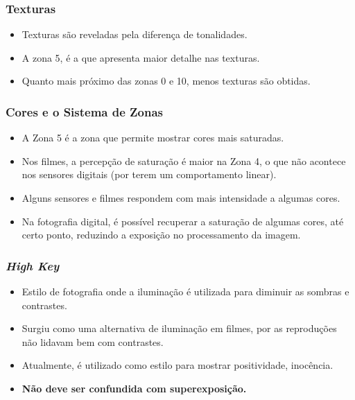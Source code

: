 

\begin{frame}
    \frametitle{Texturas}
    \begin{itemize}
      \item Texturas são reveladas pela diferença de tonalidades.
      \item A zona 5, é a que apresenta maior detalhe nas texturas.
      \item Quanto mais próximo das zonas 0 e 10, menos texturas são obtidas.
    \end{itemize}
\end{frame}


\begin{frame}
    \frametitle{Cores e o Sistema de Zonas}
    \begin{itemize}
      \item A Zona 5 é a zona que permite mostrar cores mais saturadas.
      \item Nos filmes, a percepção de saturação é maior na Zona 4, o que não acontece nos sensores
      digitais (por terem um comportamento linear).
      \item Alguns sensores e filmes respondem com mais intensidade a algumas cores.
      \item Na fotografia digital, é possível recuperar a saturação de algumas cores,
      até certo ponto, reduzindo a exposição no processamento da imagem.
    \end{itemize}
\end{frame}


\begin{frame}
    \frametitle{\textit{High Key}}
    \begin{itemize}
      \item Estilo de fotografia onde a iluminação é utilizada para diminuir as
      sombras e contrastes.
      \item Surgiu como uma alternativa de iluminação em filmes, por as reproduções
      não lidavam bem com contrastes.
      \item Atualmente, é utilizado como estilo para mostrar positividade, inocência.
      \item \textbf{Não deve ser confundida com superexposição.}
    \end{itemize}
\end{frame}

